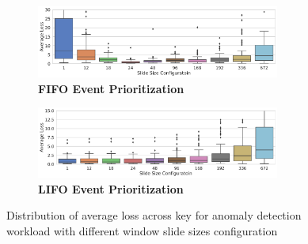 





\begin{figure}[t]
     \centering
     \begin{subfigure}[b]{\columnwidth}
         \centering
         \includegraphics[width=8cm]{ralf/figures/stl_sim_fifo.pdf}
         \caption{\textbf{FIFO Event Prioritization} }
         \label{f:stl-event-prio-fifo}
     \end{subfigure} \hfill
     \begin{subfigure}[b]{\columnwidth}
         \centering
         \includegraphics[width=8cm]{ralf/figures/stl_sim_lifo.pdf}
         \caption{\textbf{LIFO Event Prioritization} }
         \label{f:stl-event-prio-lifo}
     \end{subfigure}
        \caption{Distribution of average loss across key for anomaly detection workload with different window slide sizes configuration}
\end{figure}

